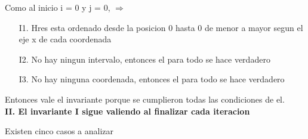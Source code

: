 \documentclass[10pt,a4paper]{article}
\begin{document}
Como al inicio i = 0 y j = 0, $\Rightarrow$ 
\begin{itemize}
\item[I1.] Hres esta ordenado desde la posicion 0 hasta 0 de menor a mayor segun el eje x de cada coordenada
\item[I2.] No hay ningun intervalo, entonces el para todo se hace verdadero
\item[I3.] No hay ninguna coordenada, entonces el para todo se hace verdadero
\end{itemize}
Entonces vale el invariante porque se cumplieron todas las condiciones de el.\\

\noindent \textbf{II. El invariante I sigue valiendo al finalizar cada iteracion}


Existen cinco casos a analizar\\
\end{document}
